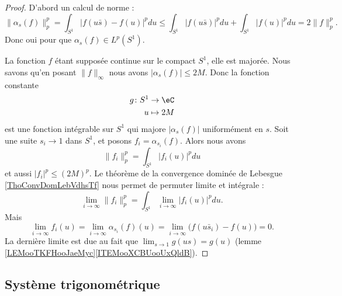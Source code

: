 \begin{proof}
	D'abord un calcul de norme :
	\begin{equation}
		\| \alpha_s(f) \|_p^p=\int_{S^1}| f(u\bar s)-f(u) |^pdu\leq\int_{S^1}| f(u\bar s) |^pdu+\int_{S^1}| f(u) |^pdu=2\| f \|_p^p.
	\end{equation}
	Donc oui pour que \( \alpha_s(f)\in L^p(S^1)\).

	La fonction \( f\) étant supposée continue sur le compact \( S^1\), elle est majorée. Nous savons qu'en posant \( \| f \|_{\infty}\) nous avons \( | \alpha_s(f) |\leq 2M\). Donc la fonction constante
	\begin{equation}
		\begin{aligned}
			g\colon S^1 & \to \eC    \\
			u           & \mapsto 2M
		\end{aligned}
	\end{equation}
	est une fonction intégrable sur \( S^1\) qui majore \( | \alpha_s(f) |\) uniformément en \( s\). Soit une suite \( s_i\to 1\) dans \( S^1\), et posons \( f_i=\alpha_{s_i}(f)\). Alors nous avons
	\begin{equation}
		\| f_i \|^p_p=\int_{S^1}| f_i(u) |^pdu
	\end{equation}
	et aussi \( | f_i |^p\leq (2M)^p\). Le théorème de la convergence dominée de Lebesgue \ref{ThoConvDomLebVdhsTf} nous permet de permuter limite et intégrale :
	\begin{equation}
		\lim_{i\to \infty} \| f_i \|_p^p=\int_{S^1}\lim_{i\to \infty} | f_i(u) |^pdu.
	\end{equation}
	Mais
	\begin{equation}
		\lim_{i\to \infty} f_i(u)=\lim_{i\to \infty} \alpha_{s_i}(f)(u)=\lim_{i\to \infty} \big( f(u\bar s_i)-f(u) \big)=0.
	\end{equation}
	La dernière limite est due au fait que \(  \lim_{s\to 1} g(us)=g(u) \) (lemme \ref{LEMooTKFHooJaeMyc}\ref{ITEMooXCBUooUxQldB}).
\end{proof}

\subsection{Système trigonométrique}

